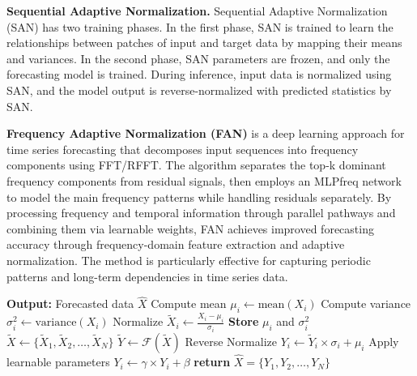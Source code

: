 \documentclass[sigconf,anonymous,review]{acmart}
\begin{document}
\textbf{Sequential Adaptive Normalization.} 
Sequential Adaptive Normalization (SAN) has two training phases.
In the first phase, SAN is trained to learn the relationships between patches of input and target data by mapping their means and variances. 
In the second phase, SAN parameters are frozen, and only the forecasting model is trained. During inference, input data is normalized using SAN, and the model output is reverse-normalized with predicted statistics by SAN.

\textbf{Frequency Adaptive Normalization (FAN)} is a deep learning approach for time series forecasting that decomposes input sequences into frequency components using FFT/RFFT. The algorithm separates the top-k dominant frequency components from residual signals, then employs an MLPfreq network to model the main frequency patterns while handling residuals separately. By processing frequency and temporal information through parallel pathways and combining them via learnable weights, FAN achieves improved forecasting accuracy through frequency-domain feature extraction and adaptive normalization. The method is particularly effective for capturing periodic patterns and long-term dependencies in time series data.

\begin{algorithm}[h]
  \caption{Reversible Instance Normalization (Revin)}
  \label{alg:revin}
     \textbf{Output:} Forecasted data $\hat{X}$ \;
         {
         Compute mean $\mu_i \gets \text{mean}(X_i)$\;
         Compute variance $\sigma_i^2 \gets \text{variance}(X_i)$ \;
         Normalize $\tilde{X}_i \gets \frac{X_i - \mu_i}{\sigma_i}$\;
         \textbf{Store} $\mu_i$ and $\sigma_i^2$ \;
         }
     $\tilde{X} \gets \{\tilde{X}_1, \tilde{X}_2, \ldots, \tilde{X}_N\}$ \;
     $\tilde{Y} \gets \mathcal{F}(\tilde{X})$ \;
    {
         Reverse Normalize $Y_i \gets \tilde{Y}_i \times \sigma_i + \mu_i$ \;
         Apply learnable parameters $Y_i \gets \gamma \times Y_i + \beta$ \;
     }
     \textbf{return} $\hat{X} = \{Y_1, Y_2, \ldots, Y_N\}$ \;
\end{algorithm}
\end{document}
